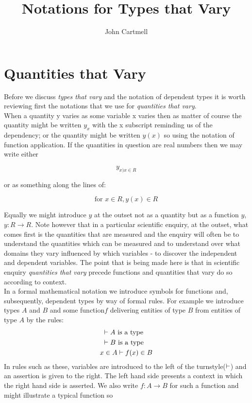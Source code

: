 \documentclass[12pt,a4paper]{article}
\title{Notations for Types that Vary}
\author{John Cartmell}
\begin{document}
\maketitle


\section{Quantities that Vary}
\noindent Before we discuss \textit{types that vary} and the notation of dependent types it is worth 
reviewing first the notations that we use for \textit{quantities that vary}.  \\

\noindent  When a quantity y varies as some variable x varies then as matter of course the quantity might be written $y_{x}$ with the x subscript  reminding us of the dependency; or the quantity might be written $y(x)$ so using the notation of function application.  
If the quantities in question are real numbers then we may write either

\begin{equation*}
y_{x)x\in R}
\end{equation*}

\noindent or as something along the lines of:

\begin{equation*}
\text{for } x \in R,  y(x) \in R
\end{equation*}

\noindent Equally we might introduce $y$ at the outset not as a quantity but as a function $y$, $y: R \rightarrow R$. Note however that in a particular scientific enquiry, at the outset, what comes first is the quantities that are measured and the enquiry will often be to understand the quantities which can be measured and to understand over what domains they vary influenced by which variables - to discover the independent and dependent variables.
The point that is being made here is that in scientific enquiry \textit{quantities that vary} precede functions and quantities that vary do so according to context. \\

\noindent In a formal mathematical notation we introduce symbols for functions and, subsequently, dependent types by way of formal rules. For example we 
introduce types $A$ and $B$ and some function$f$ delivering entities of type $B$ from entities of type $A$ by the rules:
\begin{align}
&\text{                                  }\vdash A\mbox{ is a type} \\
&\text{                                  }\vdash B\mbox{ is a type} \\
&x \in A \vdash f(x) \in B 
\end{align}
\noindent In rules such as these, variables are introduced to the left of the turnstyle($\vdash$) and 
an assertion is given to the right. The left hand side presents a context in which the right hand side is asserted. 
We also write $f: A \rightarrow B$ for such a function and might illustrate a typical function so
\end{document}
